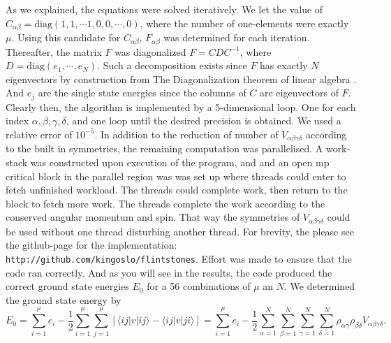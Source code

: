 \documentclass[11pt,english,a4paper]{article}
\begin{document}
As we explained, the equations were solved iteratively. We let the value of $C_{  \alpha \beta} = \text{diag}(1,1,\cdots 1,0,0,\cdots,0)$, where the number of one-elements were exactly $\mu$. Using this candidate for $C_{  \alpha \beta}$, $F_{  \alpha \beta}$ was determined for each iteration. Thereafter, the matrix $F$ was diagonalized $F = CDC^{  -1}$, where $D = \text{diag} ( e_1, \cdots, e_N)$. Such a decomposition exists since $F$ has exactly $N$ eigenvectors by construction from The Diagonalization theorem of linear algebra \parencite[282]{lay_linear_2012}. And $e_j$ are the single state energies since the columns of $C$ are eigenvectors of $F$.  Clearly then, the algorithm is implemented by a 5-dimensional loop. One for each index $\alpha, \beta, \gamma, \delta$, and one loop until the desired precision is obtained. We used a relative error of $10^{-5}$. In addition to the reduction of number of $V_{  \alpha \beta \gamma \delta}$ according to the built in symmetries, the remaining computation was parallelised. A work-stack was constructed upon execution of the program, and and an open mp critical block in the parallel region was was set up where threads could enter to fetch unfinished workload. The threads could complete work, then return to the block to fetch more work. The threads complete the work according to the conserved angular momentum and spin. That way the symmetries of $V_{  \alpha \beta \gamma \delta}$ could be used without one thread disturbing another thread. For brevity, the please see the github-page for the implementation: \texttt{http://github.com/kingoslo/flintstones}. Effort was made to ensure that the code ran correctly. And as you will see in the results, the code produced the correct ground state energies $E_0$ for a 56 combinations of $\mu$ an $N$. We determined the ground state energy by
\[
E_0 = \sum_{i=1}^\mu e_i - \frac{1}{2} \sum_{i=1}^\mu \sum_{j=1}^\mu \left[ \langle ij |v|ij \rangle - \langle ij |v |ji \rangle  \right]  = \sum_{i=1}^\mu e_i - \frac{1}{2} \sum_{\alpha=1}^N\sum_{\beta = 1}^N \sum_{\gamma = 1}^N \sum_{\delta = 1}^N \rho_{  \alpha \gamma} \rho_{  \beta \delta} V_{  \alpha \beta \gamma \delta}.
\]
\end{document}
